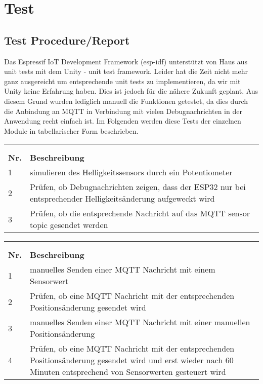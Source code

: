 \chapter{Test}
\label{cha:Test}

\section{Test Procedure/Report}
Das Espressif IoT Development Framework (esp-idf) unterstützt von Haus aus unit tests mit dem Unity - unit test framework. Leider hat die Zeit nicht mehr ganz ausgereicht um entsprechende unit tests zu implementieren, da wir mit Unity keine Erfahrung haben. Dies ist jedoch für die nähere Zukunft geplant. Aus diesem Grund wurden lediglich manuell die Funktionen getestet, da dies durch die Anbindung an MQTT in Verbindung mit vielen Debugnachrichten in der Anwendung recht einfach ist. Im Folgenden werden diese Tests der einzelnen Module in tabellarischer Form beschrieben.


\begin{longtable}[ht]{p{}  p{}}
	\captionabove[Test Sensor Module]{Test Sensor Module}\\
	\label{tab:sensortest}\\
	\toprule
	\rowcolor[HTML]{FFFC9E} 
	{\color[HTML]{333333} \textbf{Nr.}} & {\color[HTML]{333333} \textbf{Beschreibung}} \\* \midrule
	\endhead
	1 & simulieren des Helligkeitssensors durch ein Potentiometer\\* \midrule
	2 & Prüfen, ob Debugnachrichten zeigen, dass der ESP32 nur bei entsprechender Helligkeitsänderung aufgeweckt wird\\* \midrule
	3 & Prüfen, ob die entsprechende Nachricht auf das MQTT sensor topic gesendet werden \\*
	\bottomrule
\end{longtable}

\begin{longtable}[ht]{p{}  p{}}
	\captionabove[Regler Module]{Regler Module}\\
	\label{tab:reglertest}\\
	\toprule
	\rowcolor[HTML]{FFFC9E} 
	{\color[HTML]{333333} \textbf{Nr.}} & {\color[HTML]{333333} \textbf{Beschreibung}} \\* \midrule
	\endhead
	1 & manuelles Senden einer MQTT Nachricht mit einem Sensorwert\\* \midrule
	2 & Prüfen, ob eine MQTT Nachricht mit der entsprechenden Positionsänderung gesendet wird\\* \midrule
	3 & manuelles Senden einer MQTT Nachricht mit einer manuellen Positionsänderung\\* \midrule
	4 & Prüfen, ob eine MQTT Nachricht mit der entsprechenden Positionsänderung gesendet wird und erst wieder nach 60 Minuten entsprechend von Sensorwerten gesteuert wird\\*
	\bottomrule
\end{longtable}

